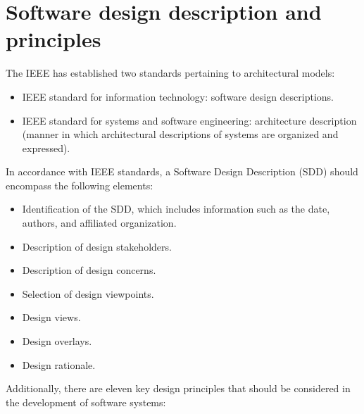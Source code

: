 \section{Software design description and principles}  

The IEEE has established two standards pertaining to architectural models:
\begin{itemize}
    \item IEEE standard for information technology: software design descriptions.
    \item IEEE standard for systems and software engineering: architecture description (manner in which architectural descriptions of systems are organized and expressed).
\end{itemize}
In accordance with IEEE standards, a Software Design Description (SDD) should encompass the following elements:
\begin{itemize}
    \item Identification of the SDD, which includes information such as the date, authors, and affiliated organization.
    \item Description of design stakeholders.
    \item Description of design concerns.
    \item Selection of design viewpoints.
    \item Design views.
    \item Design overlays.
    \item Design rationale.
\end{itemize}
Additionally, there are eleven key design principles that should be considered in the development of software systems:
